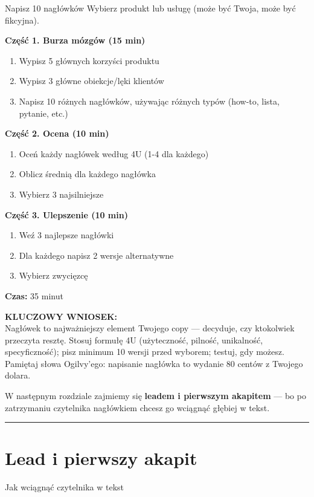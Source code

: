 \documentclass[
  12pt,
  a4paper,
  twoside,
  openright,
  12pt,
  DIV=12,
  BCOR=12mm]{scrbook}
\newcommand{\decoline}{%
  \begin{center}
    \textcolor{bordergray}{\rule{0.3\textwidth}{0.5pt}}
  \end{center}
}
\newcommand{\takeaway}[1]{%
  \begin{tcolorbox}[
    enhanced,
    colback=accentgreen!10,
    colframe=accentgreen,
    boxrule=0pt,
    borderline south={3pt}{0pt}{accentgreen},
    sharp corners,
    left=15pt, right=15pt, top=10pt, bottom=10pt
  ]
    \textbf{\color{accentgreen}KLUCZOWY WNIOSEK:}\\[5pt]
    #1
  \end{tcolorbox}
}
\begin{document}
\begin{cwiczenie}{Napisz 10 nagłówków}
Wybierz produkt lub usługę (może być Twoja, może być fikcyjna).

\textbf{Część 1. Burza mózgów (15 min)}
\begin{enumerate}
  \item Wypisz 5 głównych korzyści produktu
  \item Wypisz 3 główne obiekcje/lęki klientów
  \item Napisz 10 różnych nagłówków, używając różnych typów (how-to, lista, pytanie, etc.)
\end{enumerate}

\textbf{Część 2. Ocena (10 min)}
\begin{enumerate}
  \item Oceń każdy nagłówek według 4U (1-4 dla każdego)
  \item Oblicz średnią dla każdego nagłówka
  \item Wybierz 3 najsilniejsze
\end{enumerate}

\textbf{Część 3. Ulepszenie (10 min)}
\begin{enumerate}
  \item Weź 3 najlepsze nagłówki
  \item Dla każdego napisz 2 wersje alternatywne
  \item Wybierz zwycięzcę
\end{enumerate}

\textbf{Czas:} 35 minut
\end{cwiczenie}

\takeaway{Nagłówek to najważniejszy element Twojego copy --- decyduje, czy ktokolwiek przeczyta resztę. Stosuj formułę 4U (użyteczność, pilność, unikalność, specyficzność); pisz minimum 10 wersji przed wyborem; testuj, gdy możesz. Pamiętaj słowa Ogilvy'ego: napisanie nagłówka to wydanie 80 centów z Twojego dolara.}

W następnym rozdziale zajmiemy się \textbf{leadem i pierwszym akapitem}
--- bo po zatrzymaniu czytelnika nagłówkiem chcesz go wciągnąć głębiej w
tekst.

\decoline


\chapter{Lead i pierwszy akapit}\label{lead-i-pierwszy-akapit}

Jak wciągnąć czytelnika w tekst
\end{document}
